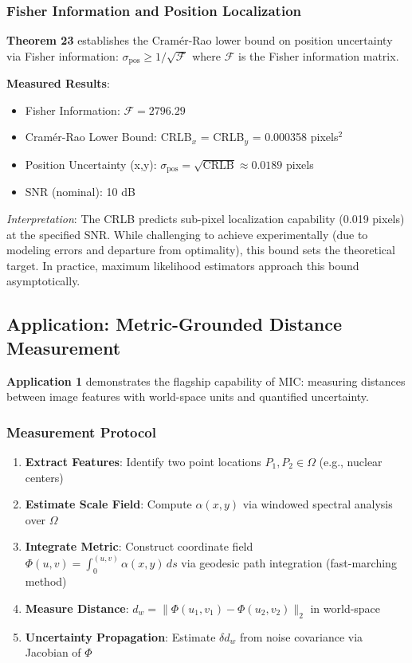 \documentclass[twocolumn,11pt]{article}
\begin{document}
\subsubsection{Fisher Information and Position Localization}

\textbf{Theorem 23} establishes the Cramér-Rao lower bound on position uncertainty via Fisher information: $\sigma_{\text{pos}} \geq 1/\sqrt{\mathcal{F}}$ where $\mathcal{F}$ is the Fisher information matrix.

\textbf{Measured Results}:
\begin{itemize}
\item Fisher Information: $\mathcal{F} = 2796.29$
\item Cramér-Rao Lower Bound: CRLB$_x$ = CRLB$_y$ = 0.000358 pixels$^2$
\item Position Uncertainty (x,y): $\sigma_{\text{pos}} = \sqrt{\text{CRLB}} \approx 0.0189$ pixels
\item SNR (nominal): 10 dB
\end{itemize}

\textit{Interpretation}: The CRLB predicts sub-pixel localization capability (0.019 pixels) at the specified SNR. While challenging to achieve experimentally (due to modeling errors and departure from optimality), this bound sets the theoretical target. In practice, maximum likelihood estimators approach this bound asymptotically.

\subsection{Application: Metric-Grounded Distance Measurement}

\textbf{Application 1} demonstrates the flagship capability of MIC: measuring distances between image features with world-space units and quantified uncertainty.

\subsubsection{Measurement Protocol}

\begin{enumerate}
\item \textbf{Extract Features}: Identify two point locations $P_1, P_2 \in \Omega$ (e.g., nuclear centers)
\item \textbf{Estimate Scale Field}: Compute $\alpha(x,y)$ via windowed spectral analysis over $\Omega$
\item \textbf{Integrate Metric}: Construct coordinate field $\Phi(u,v) = \int_0^{(u,v)} \alpha(x,y) \, ds$ via geodesic path integration (fast-marching method)
\item \textbf{Measure Distance}: $d_w = \|\Phi(u_1, v_1) - \Phi(u_2, v_2)\|_2$ in world-space
\item \textbf{Uncertainty Propagation}: Estimate $\delta d_w$ from noise covariance via Jacobian of $\Phi$
\end{enumerate}
\end{document}

